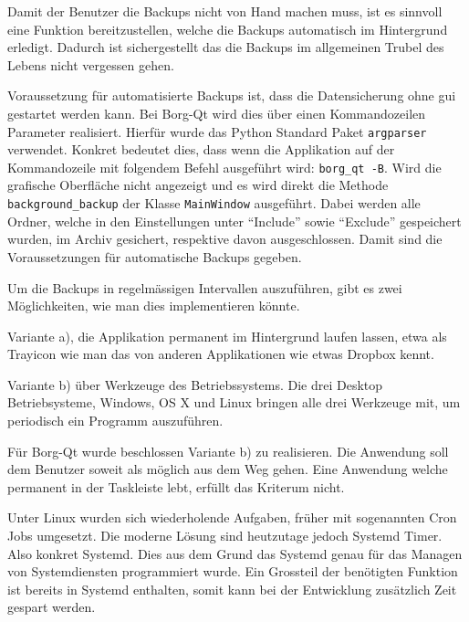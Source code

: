 Damit der Benutzer die Backups nicht von Hand machen muss, ist es sinnvoll eine
Funktion bereitzustellen, welche die Backups automatisch im Hintergrund
erledigt. Dadurch ist sichergestellt das die Backups im allgemeinen Trubel des
Lebens nicht vergessen gehen.

Voraussetzung für automatisierte Backups ist, dass die Datensicherung ohne
\gls{gui} gestartet werden kann. Bei Borg-Qt wird dies über einen Kommandozeilen
Parameter realisiert. Hierfür wurde das Python Standard Paket \texttt{argparser}
verwendet. Konkret bedeutet dies, dass wenn die Applikation auf der
Kommandozeile mit folgendem Befehl ausgeführt wird: \texttt{borg\_qt -B}. Wird die
grafische Oberfläche nicht angezeigt und es wird direkt die Methode
\texttt{background\_backup} der Klasse \texttt{MainWindow} ausgeführt. Dabei werden alle
Ordner, welche in den Einstellungen unter "`Include"' sowie "`Exclude"' gespeichert
wurden, im Archiv gesichert, respektive davon ausgeschlossen. Damit sind die
Voraussetzungen für automatische Backups gegeben.

Um die Backups in regelmässigen Intervallen auszuführen, gibt es zwei
Möglichkeiten, wie man dies implementieren könnte.

Variante a), die Applikation permanent im Hintergrund laufen lassen, etwa als
Trayicon wie man das von anderen Applikationen wie etwas Dropbox kennt.

Variante b) über Werkzeuge des Betriebssystems. Die drei Desktop
Betriebsysteme, Windows, OS X und Linux bringen alle drei Werkzeuge mit, um
periodisch ein Programm auszuführen.

Für Borg-Qt wurde beschlossen Variante b) zu realisieren. Die Anwendung soll
dem Benutzer soweit als möglich aus dem Weg gehen. Eine Anwendung welche
permanent in der Taskleiste lebt, erfüllt das Kriterum nicht.

Unter Linux wurden sich wiederholende Aufgaben, früher mit sogenannten Cron
Jobs umgesetzt. Die moderne Lösung sind heutzutage jedoch Systemd Timer. Also
konkret Systemd. Dies aus dem Grund das Systemd genau für das Managen von
Systemdiensten programmiert wurde. Ein Grossteil der benötigten Funktion ist
bereits in Systemd enthalten, somit kann bei der Entwicklung zusätzlich Zeit
gespart werden.

